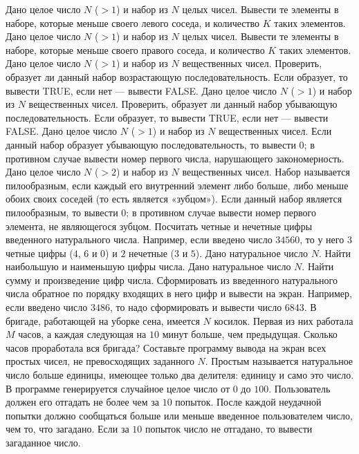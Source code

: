 Дано целое число $N$ ($> 1$) и набор из $N$ целых чисел. Вывести те элементы в наборе, которые меньше своего левого соседа, и количество $K$ таких элементов.
Дано целое число $N$ ($> 1$) и набор из $N$ целых чисел. Вывести те элементы в наборе, которые меньше своего правого соседа, и количество $K$ таких элементов.
Дано целое число $N$ ($> 1$) и набор из $N$ вещественных чисел. Проверить, образует ли данный набор возрастающую последовательность. Если образует, то вывести TRUE, если нет --- вывести FALSE.
Дано целое число $N$ ($> 1$) и набор из $N$ вещественных чисел. Проверить, образует ли данный набор убывающую последовательность. Если образует, то вывести TRUE, если нет --- вывести FALSE.
Дано целое число $N$ ($> 1$) и набор из $N$ вещественных чисел. Если данный набор образует убывающую последовательность, то вывести $0$; в противном случае вывести номер первого числа, нарушающего закономерность.
Дано целое число $N$ ($> 2$) и набор из $N$ вещественных чисел. Набор называется пилообразным, если каждый его внутренний элемент либо больше, либо меньше обоих своих соседей (то есть является «зубцом»). Если данный набор является пилообразным, то вывести $0$; в противном случае вывести номер первого элемента, не являющегося зубцом.
Посчитать четные и нечетные цифры введенного натурального числа. Например, если введено число $34560$, то у него $3$ четные цифры ($4$, $6$ и $0$) и $2$ нечетные ($3$ и $5$).
Дано натуральное число $N$. Найти наибольшую и наименьшую цифры числа.
Дано натуральное число $N$. Найти сумму и произведение цифр числа.
Сформировать из введенного натурального числа обратное по порядку входящих в него цифр и вывести на экран. Например, если введено число $3486$, то надо сформировать и вывести число $6843$.
В бригаде, работающей на уборке сена, имеется $N$ косилок. Первая из них работала $M$ часов, а каждая следующая на $10$ минут больше, чем предыдущая. Сколько часов проработала вся бригада?
Составьте программу вывода на экран всех простых чисел, не превосходящих заданного $N$. Простым называется натуральное число больше единицы, имеющее только два делителя: единицу и само это число.
В программе генерируется случайное целое число от $0$ до $100$. Пользователь должен его отгадать не более чем за $10$ попыток. После каждой неудачной попытки должно сообщаться больше или меньше введенное пользователем число, чем то, что загадано. Если за $10$ попыток число не отгадано, то вывести загаданное число.

